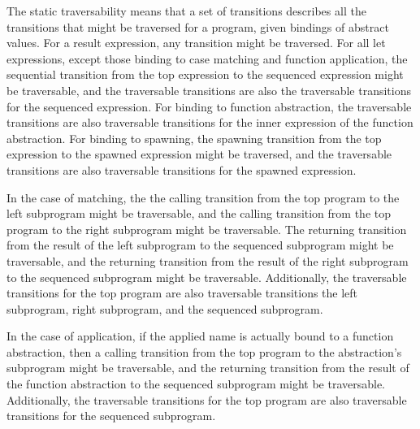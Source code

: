 \documentclass{article}
\begin{document}
The static traversability means that a set of transitions describes all the transitions
that might be traversed for a program, given bindings of abstract values.  For a result
expression, any transition might be traversed.  For all let expressions, except those binding
to case matching and function application, the sequential transition from the top expression to
the sequenced expression might be traversable, and the traversable transitions are also the
traversable transitions for the sequenced expression.  For binding to function abstraction, the
traversable transitions are also traversable transitions for the inner expression of the
function abstraction.  For binding to spawning, the spawning transition from the top expression
to the spawned expression might be traversed, and the traversable transitions are also
traversable transitions for the spawned expression.

In the case of matching, the the calling transition from the top program to
the left subprogram might be traversable, and
the calling transition from the top program to the
right subprogram might be traversable.  The returning transition from the result of the
left subprogram to the sequenced subprogram might be traversable, and the returning
transition from the result of the right subprogram to the sequenced subprogram might be
traversable.  Additionally, the traversable transitions for the top program are also
traversable transitions the left subprogram, right subprogram, and the sequenced subprogram.   

In the case of application, if the applied name is actually bound to a function
abstraction, then a calling transition from the top program to the abstraction's subprogram
might be traversable, and the returning transition from the result of the function
abstraction to the sequenced subprogram might be traversable.
Additionally, the traversable transitions for the top program are also
traversable transitions for the sequenced subprogram. 
\end{document}
